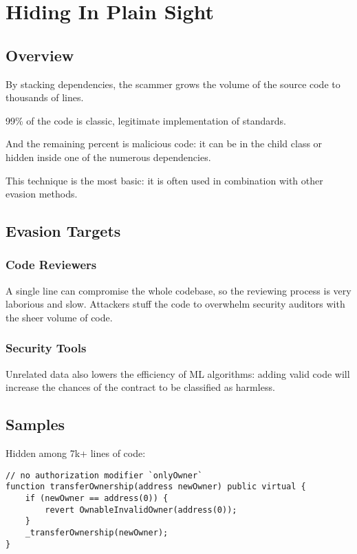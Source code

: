 \section{Hiding In Plain Sight} \label{sec:hiding-in-plain-sight}

\subsection{Overview}

By stacking dependencies, the scammer grows the volume of the source code to thousands of lines.

99\% of the code is classic, legitimate implementation of standards.

And the remaining percent is malicious code: it can be in the child class or hidden inside one of the numerous dependencies.

This technique is the most basic: it is often used in combination with other evasion methods.

\subsection{Evasion Targets}

\subsubsection{Code Reviewers}

A single line can compromise the whole codebase, so the reviewing process is very laborious and slow.
Attackers stuff the code to overwhelm security auditors with the sheer volume of code.

\subsubsection{Security Tools}

Unrelated data also lowers the efficiency of ML algorithms:
adding valid code will increase the chances of the contract to be classified as harmless.

\subsection{Samples}

Hidden among 7k+ lines of code:

\begin{lstlisting}[language=Solidity]
// no authorization modifier `onlyOwner`
function transferOwnership(address newOwner) public virtual {
    if (newOwner == address(0)) {
        revert OwnableInvalidOwner(address(0));
    }
    _transferOwnership(newOwner);
}
\end{lstlisting}

